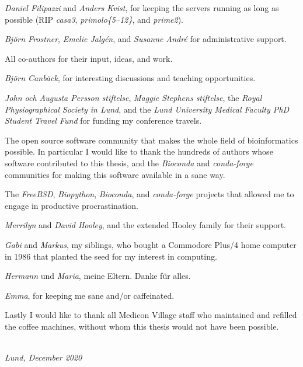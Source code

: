 \textit{Daniel Filipazzi} and \textit{Anders Kvist}, for keeping the servers running as long as possible (RIP \textit{casa3}, \textit{primolo\{5--12\}}, and \textit{prime2}).

\textit{Björn Frostner}, \textit{Emelie Jalgén}, and \textit{Susanne André} for administrative support.

All co-authors for their input, ideas, and work.

\textit{Björn Canbäck}, for interesting discussions and teaching opportunities.

\textit{John och Augusta Persson stiftelse}, \textit{Maggie Stephens stiftelse}, the \textit{Royal Physiographical Society in Lund}, and the \textit{Lund University Medical Faculty PhD Student Travel Fund} for funding my conference travels.

The open source software community that makes the whole field of bioinformatics possible. In particular I would like to thank the hundreds of authors whose software contributed to this thesis, and the \textit{Bioconda} and \textit{conda-forge} communities for making this software available in a sane way.

The \textit{FreeBSD}, \textit{Biopython}, \textit{Bioconda}, and \textit{conda-forge} projects that allowed me to engage in productive procrastination.

\textit{Merrilyn} and \textit{David Hooley}, and the extended Hooley family for their support.

\textit{Gabi} and \textit{Markus}, my siblings, who bought a Commodore Plus/4 home computer in 1986 that planted the seed for my interest in computing.

\textit{Hermann} und \textit{Maria}, meine Eltern. Danke für alles.

\textit{Emma}, for keeping me sane and/or caffeinated.

Lastly I would like to thank all Medicon Village staff who maintained and refilled the coffee machines, without whom this thesis would not have been possible.

\vspace{1em}
\begin{flushright}
\textit{\myName \\ Lund, December 2020}
\end{flushright}
